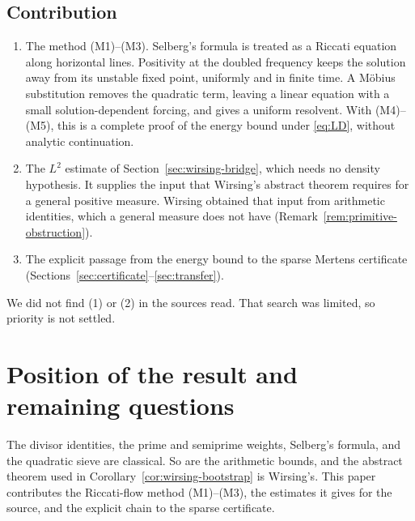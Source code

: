 \documentclass[11pt,letterpaper]{article}
\numberwithin{equation}{section}
\theoremstyle{definition}
\theoremstyle{remark}
\begin{document}
\subsection{Contribution}

\begin{enumerate}
 \item The method (M1)--(M3). Selberg's formula is treated as a Riccati
       equation along horizontal lines. Positivity at the doubled frequency
       keeps the solution away from its unstable fixed point, uniformly and
       in finite time. A M\"obius substitution removes the quadratic term,
       leaving a linear equation with a small solution-dependent forcing,
       and gives a uniform resolvent. With (M4)--(M5), this is a complete proof
       of the energy bound under \eqref{eq:LD}, without analytic
       continuation.
 \item The $L^2$ estimate of Section~\ref{sec:wirsing-bridge}, which needs
       no density hypothesis. It supplies the input that Wirsing's abstract
       theorem requires for a general positive measure. Wirsing obtained
       that input from arithmetic identities, which a general measure does
       not have (Remark~\ref{rem:primitive-obstruction}).
 \item The explicit passage from the energy bound to the sparse Mertens
       certificate (Sections~\ref{sec:certificate}--\ref{sec:transfer}).
\end{enumerate}
We did not find (1) or (2) in the sources read. That search was limited, so
priority is not settled.

\section{Position of the result and remaining questions}\label{sec:position}

The divisor identities, the prime and semiprime weights, Selberg's formula,
and the quadratic sieve are classical. So are the arithmetic bounds, and
the abstract theorem used in Corollary~\ref{cor:wirsing-bootstrap} is
Wirsing's. This paper contributes the Riccati-flow method (M1)--(M3), the
estimates it gives for the source, and the explicit chain to the sparse
certificate.
\end{document}
